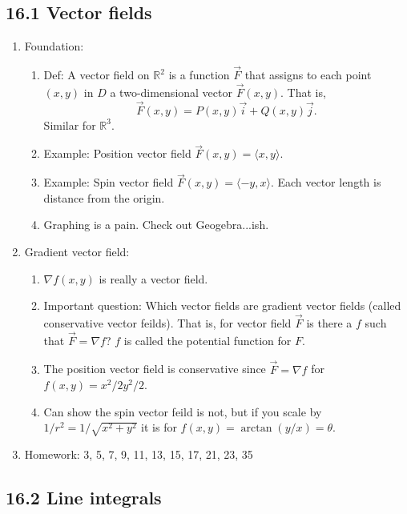 \documentclass{article}
\begin{document}
\subsection{16.1 Vector fields}

\begin{enumerate}

\item Foundation:
\begin{enumerate}
\item Def: A vector field on $\mathbb{R}^2$ is a function $\vec{F}$ that assigns to each point $(x,y)$ in $D$ a two-dimensional vector $\vec{F}(x,y)$. That is,
\[
\vec{F}(x,y) = P(x,y) \vec{i} + Q(x,y) \vec{j}.
\]
Similar for $\mathbb{R}^3$.
\item Example: Position vector field $\vec{F}(x,y) = \langle x,y \rangle$. 
\item Example: Spin vector field $\vec{F}(x,y) = \langle -y, x \rangle$. Each vector length is distance from the origin.
\item Graphing is a pain. Check out Geogebra...ish.
\end{enumerate}

\item Gradient vector field: 
\begin{enumerate}
\item $\nabla f(x,y)$ is really a vector field. 
\item Important question: Which vector fields are gradient vector fields (called conservative vector feilds). That is, for vector field $\vec{F}$ is there a $f$ such that $\vec{F} = \nabla f$? $f$ is called the potential function for $F$.
\item The position vector field is conservative since $\vec{F} = \nabla f$ for $f(x,y)=x^2/2 y^2/2$. 
\item Can show the spin vector feild is not, but if you scale by $1/r^2 = 1/\sqrt{x^2+y^2}$ it is for $f(x,y)=\arctan(y/x)=\theta$.
\end{enumerate}

\item Homework: 3, 5, 7, 9, 11, 13, 15, 17, 21, 23, 35

\end{enumerate}

\subsection{16.2 Line integrals}
\end{document}
